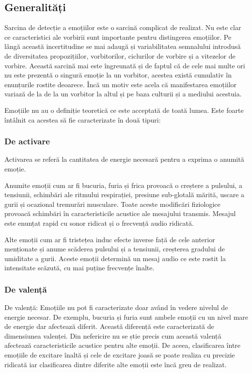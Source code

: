 \documentclass[9pt,shortpaper,twoside,web]{ieeecolor}
\begin{document}
\subsection{Generalități}
Sarcina de detecție a emoțiilor este o sarcină complicat de realizat. Nu este clar ce caracteristici ale vorbirii sunt importante pentru distingerea emoțiilor. Pe lângă această incertitudine se mai adaugă și variabilitatea semnalului introdusă de diversitatea propozițiilor, vorbitorilor, ciclurilor de vorbire și a vitezelor de vorbire. Această sarcină mai este îngreunată și de faptul că de cele mai multe ori nu este prezentă o singură emoție la un vorbitor, acestea există cumulativ în enunțurile rostite deoarece. Încă un motiv este acela că manifestarea emoțiilor variază de la de la un vorbitor la altul și pe baza culturii și a mediului acestuia. 

Emoțiile nu au o definiție teoretică ce este acceptată de toată lumea. Este foarte întâlnit ca acestea să fie caracterizate în două tipuri:


\subsubsection{De activare}
Activarea se referă la cantitatea de energie necesară pentru a exprima o anumită emoție.

Anumite emoții cum ar fi bucuria, furia și frica provoacă o creștere a pulsului, a tensiunii, schimbări ale ritmului respirației, presiune sub-glotală mărită, uscare a gurii și ocazional tremurări musculare. Toate aceste modificări fiziologice provoacă schimbări în caracteristicile acustice ale mesajului transmis. Mesajul este enunțat rapid cu sonor ridicat și o frecvență audio ridicată.

Alte emoții cum ar fi tristețea induc efecte inverse față de cele anterior menționate și anume scăderea pulsului și a tensiunii, creșterea gradului de umiditate a gurii. Aceste emoții determină un mesaj audio ce este rostit la intensitate scăzută, cu mai puține frecvențe înalte.


\subsubsection{De valență} 
De valență: Emoțiile nu pot fi caracterizate doar având în vedere nivelul de energie necesar. De exemplu, bucuria și furia sunt ambele emoții cu un nivel mare de energie dar afectează diferit. Această diferență este caracterizată de dimensiunea valenței. Din nefericire nu se știe precis cum această valență afectează caracteristicile acustice pentru alte emoții. De aceea, clasificarea între emoțiile de excitare înaltă și cele de excitare joasă se poate realiza cu precizie ridicată iar clasificarea dintre diferite alte emoții este încă greu de realizat.
\end{document}
